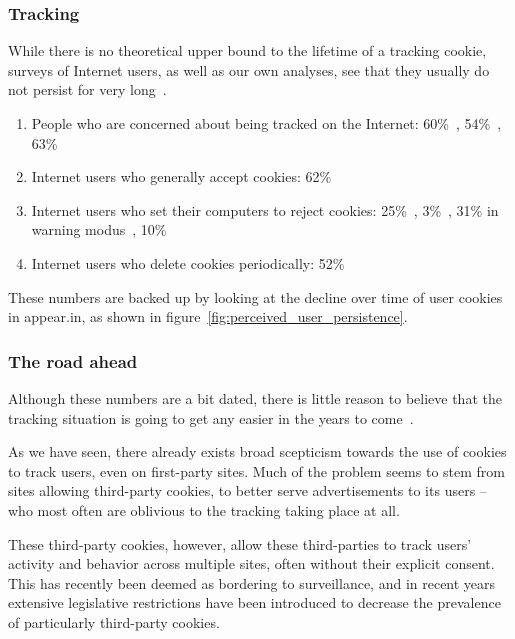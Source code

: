     \subsubsection{Tracking}

      While there is no theoretical upper bound to the lifetime of a tracking cookie, surveys of Internet users, as well as our own analyses, see that they usually do not persist for very long~\cite{Teltzrow2004}.

      \begin{enumerate}
        \item People who are concerned about being tracked on the Internet: 60\%~\cite{CyberDialogue2001}, 54\%~\cite{Fox2000}, 63\%~\cite{Harris2000}
        \item Internet users who generally accept cookies: 62\%~\cite{PersonalizationConsortium2000}
        \item Internet users who set their computers to reject cookies: 25\%~\cite{Culnan2001}, 3\%~\cite{CyberDialogue2001}, 31\% in warning modus~\cite{CyberDialogue2001}, 10\%\cite{Fox2000}
        \item Internet users who delete cookies periodically: 52\%~\cite{PersonalizationConsortium2000}
      \end{enumerate}

      These numbers are backed up by looking at the decline over time of user cookies in appear.in, as shown in figure~\ref{fig:perceived_user_persistence}.

    \subsubsection{The road ahead}

      Although these numbers are a bit dated, there is little reason to believe that the tracking situation is going to get any easier in the years to come~\cite{RuizMartinez2012,Nikiforakis2013,Sorensen2013,Eijk2011}.

      As we have seen, there already exists broad scepticism towards the use of cookies to track users, even on first-party sites. Much of the problem seems to stem from sites allowing third-party cookies, to better serve advertisements to its users -- who most often are oblivious to the tracking taking place at all.

      These third-party cookies, however, allow these third-parties to track users' activity and behavior across multiple sites, often without their explicit consent. This has recently been deemed as bordering to surveillance, and in recent years extensive legislative restrictions have been introduced to decrease the prevalence of particularly third-party cookies.

